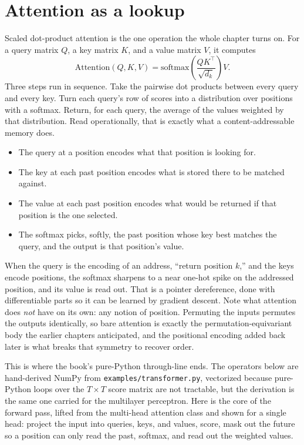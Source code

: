 
\section{Attention as a lookup}\label{sec:attention-lookup}

Scaled dot-product attention is the one operation the whole chapter turns on.
For a query matrix $Q$, a key matrix $K$, and a value matrix $V$, it computes
\[
  \mathrm{Attention}(Q, K, V)
  = \mathrm{softmax}\!\left(\frac{Q K^{\top}}{\sqrt{d_k}}\right) V .
\]
Three steps run in sequence. Take the pairwise dot products between every
query and every key. Turn each query's row of scores into a distribution over
positions with a softmax. Return, for each query, the average of the values
weighted by that distribution. Read operationally, that is exactly what a
content-addressable memory does.

\begin{itemize}
\item The query at a position encodes what that position is looking for.
\item The key at each past position encodes what is stored there to be
matched against.
\item The value at each past position encodes what would be returned if that
position is the one selected.
\item The softmax picks, softly, the past position whose key best matches the
query, and the output is that position's value.
\end{itemize}

When the query is the encoding of an address, ``return position $k$,'' and the
keys encode positions, the softmax sharpens to a near one-hot spike on the
addressed position, and its value is read out. That is a pointer dereference,
done with differentiable parts so it can be learned by gradient descent. Note
what attention does \emph{not} have on its own: any notion of position. Permuting
the inputs permutes the outputs identically, so bare attention is exactly the
permutation-equivariant body the earlier chapters anticipated, and the positional
encoding added back later is what breaks that symmetry to recover order.

This is where the book's pure-Python through-line ends. The operators below
are hand-derived NumPy from \texttt{examples/transformer.py}, vectorized
because pure-Python loops over the $T \times T$ score matrix are not
tractable, but the derivation is the same one  carried
for the multilayer perceptron. Here is the core of the forward pass, lifted
from the multi-head attention class and shown for a single head: project the
input into queries, keys, and values, score, mask out the future so a
position can only read the past, softmax, and read out the weighted values.

